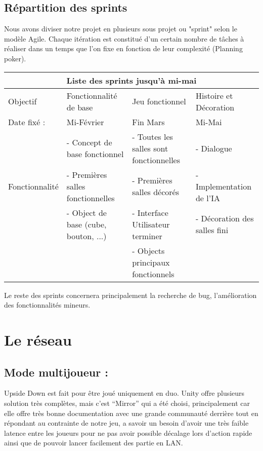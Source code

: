 \documentclass[a4paper,11pt]{article}
\begin{document}
\subsection{Répartition des sprints}

Nous avons diviser notre projet en plusieurs sous projet ou "sprint" selon le modèle Agile.
Chaque itération est constitué d'un certain nombre de tâches à réaliser dans un temps que l'on fixe 
en fonction de leur complexité (Planning poker).\newline



\begin{tabular}{ |p{3cm}||p{3cm}|p{3cm}|p{3cm}|  }
 \hline
 \multicolumn{4}{|c|}{Liste des sprints jusqu'à mi-mai} \\
 \hline
 Objectif& Fonctionnalité de base  & Jeu fonctionnel & Histoire et Décoration\\
 \hline
 \hline
 Date fixé : & Mi-Février & Fin Mars & Mi-Mai\\
 \hline
 \multirow{3}{4em}{Fonctionnalité} & - Concept de base fonctionnel & - Toutes les salles sont fonctionnelles & - Dialogue\\ 
 & - Premières salles fonctionnelles & - Premières salles décorés & - Implementation de l'IA\\ 
 & - Object de base (cube, bouton, ...) & - Interface Utilisateur terminer & - Décoration des salles fini\\ 
 & & - Objects principaux fonctionnels & \\

 \hline
\end{tabular}


Le reste des sprints concernera principalement la recherche de bug, l'amélioration des 
fonctionnalités mineurs.



\section{Le réseau}

\subsection{Mode multijoueur :} 
	
Upside Down est fait pour être joué uniquement en duo. Unity offre plusieurs solution très complètes, 
mais c’est “Mirror” qui a été choisi, principalement car elle offre très bonne documentation avec une 
grande communauté derrière tout en répondant au contrainte de notre jeu, a savoir un besoin d’avoir une 
très faible latence entre les joueurs pour ne pas avoir possible décalage lors d’action rapide ainsi 
que de pouvoir lancer facilement des partie en LAN.
\end{document}
